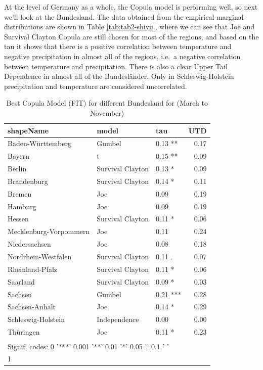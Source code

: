 \documentclass[
]{krantz}
\begin{document}
At the level of Germany as a whole, the Copula model is performing well, so next we'll look at the Bundesland. The data obtained from the empirical marginal distributions are shown in Table \ref{tab:tab2-shiyu}, where we can see that Joe and Survival Clayton Copula are still chosen for most of the regions, and based on the tau it shows that there is a positive correlation between temperature and negative precipitation in almost all of the regions, i.e.~a negative correlation between temperature and precipitation. There is also a clear Upper Tail Dependence in almost all of the Bundesländer. Only in Schleswig-Holstein precipitation and temperature are considered uncorrelated.

\begin{table}

\caption{\label{tab:tab3-shiyu}Best Copula Model (FIT) for different Bundesland for (March to November)}
\centering
\begin{tabular}[t]{l|l|l|r}
\hline
shapeName & model & tau & UTD\\
\hline
Baden-Württemberg & Gumbel & 0.13 ** & 0.17\\
\hline
Bayern & t & 0.15 ** & 0.09\\
\hline
Berlin & Survival Clayton & 0.13 * & 0.09\\
\hline
Brandenburg & Survival Clayton & 0.14 * & 0.11\\
\hline
Bremen & Joe & 0.09 & 0.19\\
\hline
Hamburg & Joe & 0.09 & 0.19\\
\hline
Hessen & Survival Clayton & 0.11 * & 0.06\\
\hline
Mecklenburg-Vorpommern & Joe & 0.11 & 0.24\\
\hline
Niedersachsen & Joe & 0.08 & 0.18\\
\hline
Nordrhein-Westfalen & Survival Clayton & 0.11 . & 0.07\\
\hline
Rheinland-Pfalz & Survival Clayton & 0.11 * & 0.06\\
\hline
Saarland & Survival Clayton & 0.09 * & 0.03\\
\hline
Sachsen & Gumbel & 0.21 *** & 0.28\\
\hline
Sachsen-Anhalt & Joe & 0.14 * & 0.29\\
\hline
Schleswig-Holstein & Independence & 0.00 & 0.00\\
\hline
Thüringen & Joe & 0.11 * & 0.23\\
\hline
\multicolumn{4}{l}{\textsuperscript{} Signif. codes: 0 '***' 0.001 '**' 0.01 '*' 0.05 '.' 0.1 ' '}\\
\multicolumn{4}{l}{1}\\
\end{tabular}
\end{table}
\end{document}
